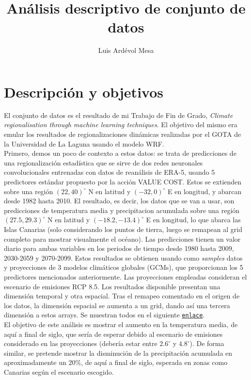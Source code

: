 \documentclass[9pt,twocolumn,twoside]{opticajnl}
\title{Análisis descriptivo de conjunto de datos}
\author[1,2,3]{Luis Ardévol Mesa}
\begin{document}
\maketitle

\section{Descripción y objetivos}

El conjunto de datos es el resultado de mi Trabajo de Fin de Grado, \textit{Climate regionalisation through machine learning techniques}. El objetivo del mismo era emular los resultados de regionalizaciones dinámicas realizadas por el GOTA de la Universidad de La Laguna usando el modelo WRF. \\

Primero, demos un poco de contexto a estos datos: se trata de predicciones de una regionalización estadística que se sirve de dos redes neuronales convolucionales entrenadas con datos de reanálisis de ERA-5, usando 5 predictores estándar propuesto por la acción VALUE COST. Estos se extienden sobre una región $(22, 40)^\circ$ N en latitud y $(-32, 0)^\circ$ E en longitud, y abarcan desde 1982 hasta 2010. El resultado, es decir, los datos que se van a usar, son predicciones de temperatura media y precipitacion acumulada sobre una región $(27.5, 29.3)^\circ$ N en latitud y $(-18.2, -13.4)^\circ$ E en longitud, lo que abarca las Islas Canarias (solo considerando los puntos de tierra, luego se remapean al grid completo para mostrar visualmente el océano). Las predicciones tienen un valor diario para ambas variables en los periodos de tiempo desde 1980 hasta 2009, 2030-2059 y 2070-2099. Estos resultados se obtienen usando como \textit{samples} datos y proyecciones de 3 modelos climáticos globales (GCMs), que proporcionan los 5 predictores mencionados anteriormente. Las proyecciones empleadas consideran el escenario de emisiones RCP 8.5. Los resultados disponible presentan una dimensión temporal y otra espacial. Tras el remapeo comentado en el origen de los datos, la dimensión espacial se aumenta a un grid, dando así una tercera dimensión a estos arrays. Se muestran todos en el siguiente \texttt{\href{https://drive.google.com/drive/folders/1iwTRm0Ibb-NRyxuiQCVuFF2_RFj2Wlel?usp=share_link}{enlace}}. \\

El objetivo de este análisis es mostrar el aumento en la temperatura media, de aquí a final de siglo, que sería de esperar debido al escenario de emisiones considerado en las proyecciones (debería estar entre $2.6^\circ$ y $4.8^\circ$). De forma similar, se pretende mostrar la disminución de la precipitación acumulada en aproximadamente un $20\%$, de aquí a final de siglo, esperada en zonas como Canarias según el escenario escogido. 
\end{document}
